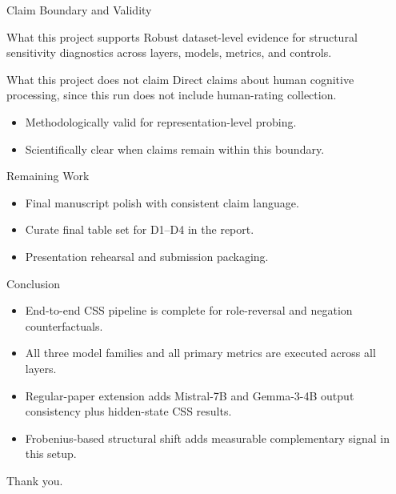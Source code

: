 \documentclass[aspectratio=169,11pt]{beamer}
\begin{document}
\begin{frame}{Claim Boundary and Validity}
\begin{block}{What this project supports}
Robust dataset-level evidence for structural sensitivity diagnostics across layers, models, metrics, and controls.
\end{block}
\begin{block}{What this project does not claim}
Direct claims about human cognitive processing, since this run does not include human-rating collection.
\end{block}
\vspace{0.3em}
\begin{itemize}
  \item Methodologically valid for representation-level probing.
  \item Scientifically clear when claims remain within this boundary.
\end{itemize}
\end{frame}

\begin{frame}{Remaining Work}
\begin{itemize}
  \item Final manuscript polish with consistent claim language.
  \item Curate final table set for D1--D4 in the report.
  \item Presentation rehearsal and submission packaging.
\end{itemize}
\end{frame}

\begin{frame}{Conclusion}
\begin{itemize}
  \item End-to-end CSS pipeline is complete for role-reversal and negation counterfactuals.
  \item All three model families and all primary metrics are executed across all layers.
  \item Regular-paper extension adds Mistral-7B and Gemma-3-4B output consistency plus hidden-state CSS results.
  \item Frobenius-based structural shift adds measurable complementary signal in this setup.
\end{itemize}
\vspace{0.5em}
\centering
\Large Thank you.
\end{frame}
\end{document}
